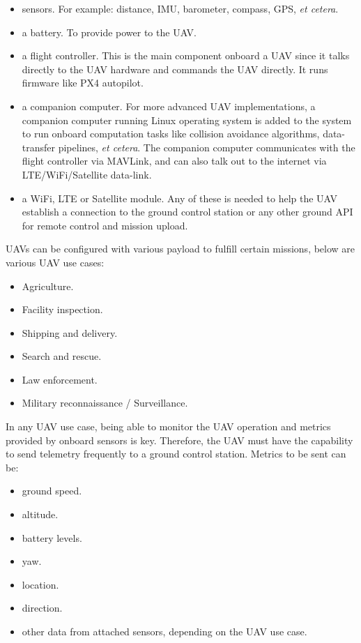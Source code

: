 \begin{itemize}
    \item sensors.  For example: distance, IMU, barometer, compass, GPS, \textit{et cetera}.
    \item a battery. To provide power to the UAV.
    \item a flight controller. This is the main component onboard a UAV since it talks directly to the UAV hardware and commands the UAV directly. It runs firmware like PX4 autopilot.
    \item a companion computer. For more advanced UAV implementations, a companion computer running Linux operating system is added to the system to run onboard computation tasks like collision avoidance algorithms, data-transfer pipelines, \textit{et cetera}. The companion computer communicates with the flight controller via MAVLink, and can also talk out to the internet via LTE/WiFi/Satellite data-link.
    \item a WiFi, LTE or Satellite module. Any of these is needed to help the UAV establish a connection to the ground control station or any other ground API for remote control and mission upload.
\end{itemize}

UAVs can be configured with various payload to fulfill certain missions, below are various UAV use cases:
\begin{itemize}
    \item Agriculture\cite{djienterprisedonesinagriculture}.
    \item Facility inspection\cite{dronesinfacilityinspection}.
    \item Shipping and delivery\cite{insiderintelligence2022}.
    \item Search and rescue\cite{dronesinsearchandrescue}.
    \item Law enforcement\cite{djidronesinlawenforcement}.
    \item Military reconnaissance / Surveillance\cite{dwdronesinbundeswehr}.
\end{itemize}

In any UAV use case, being able to monitor the UAV operation and metrics provided by onboard sensors is key. Therefore, the UAV must have the capability to send telemetry frequently to a ground control station. Metrics to be sent can be:
\begin{itemize}
    \item ground speed.
    \item altitude.
    \item battery levels.
    \item yaw.
    \item location.
    \item direction.
    \item other data from attached sensors, depending on the UAV use case.
\end{itemize}

